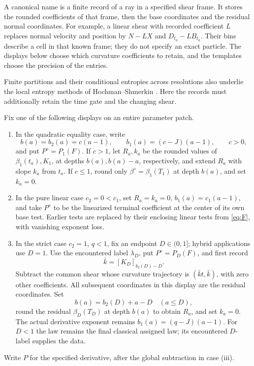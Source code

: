 A canonical name is a finite record of a ray in a specified shear frame.
It stores the rounded coefficients of that frame, then the base coordinates
and the residual normal coordinates. For example, a linear shear with
recorded coefficient $L$ replaces normal velocity and position by
$N-LX$ and $D_{t_a}-LB_{t_a}$. Their bins describe a cell in that known
frame; they do not specify an exact particle. The displays below choose
which curvature coefficients to retain, and the templates choose the
precision of the entries.

Finite partitions and their conditional entropies across resolutions also
underlie the local entropy methods of Hochman--Shmerkin
\cite[Section~4]{HochmanShmerkin2012}. Here the records must additionally retain
the time gate and the changing shear.

\begin{definition}\label{names:curvature-displays}
Fix one of the following displays on an entire parameter patch.
\begin{enumerate}[label=(\roman*)]
\item In the quadratic equality case, write
\[
 b(a)=b_2(a)=c(a-1),\qquad b_1(a)=(c-J)(a-1),\qquad c>0,
\]
and put \(P^\diamond=P_1(F)\). If \(c>1\), let \(R_a,k_a\)
be the rounded values of \(\beta_1(t_a),K_1\), at depths
\(b(a),b(a)-a\), respectively, and extend \(R_a\) with slope
\(k_a\) from \(t_a\). If \(c\leq1\), round only
\(\beta^\diamond=\beta_1(T_1)\) at depth \(b(a)\), and set
\(k_a=0\).
\item In the pure linear case \(c_2=0<c_1\), set \(R_a=k_a=0\),
\(b_1(a)=c_1(a-1)\), and take \(P^\diamond\) to be the
linearized terminal coefficient at the center of its own base test.
Earlier tests are replaced by their enclosing linear tests from
\eqref{eq:F}, with vanishing exponent loss.
\item In the strict case \(c_2=1\), \(q<1\), fix an endpoint
\(D\in(0,1]\); hybrid applications use \(D=1\). Use the encountered
label \(\lambda_D\), put \(P^\diamond=P_D(F)\), and first record
\[
 \bar k=[K_D]_{b_2(D)-D}.
\]
Subtract the common shear whose curvature trajectory is
\((\bar k t,\bar k)\), with zero other coefficients. All subsequent
coordinates in this display are the residual coordinates. Set
\[
 b(a)=b_2(D)+a-D\quad(a\leq D),
\]
round the residual \(\beta_D(T_D)\) at depth \(b(a)\) to obtain
\(R_a\), and set \(k_a=0\). The actual derivative exponent remains
\(b_1(a)=(q-J)(a-1)\). For \(D<1\) the law remains the final
classical assigned law; its encountered \(D\)-label supplies the data.
\end{enumerate}
Write \(P\) for the specified derivative, after the global subtraction
in case (iii).
\end{definition}

